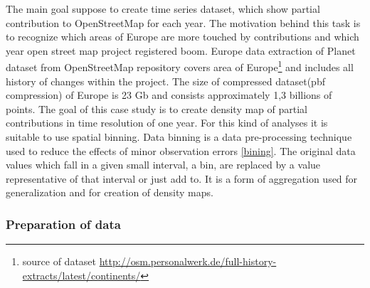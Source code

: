 \documentclass[a4paper,12pt,oneside]{report}
\begin{document}
	The main goal suppose to create time series dataset, which show partial contribution to OpenStreetMap for each year. The motivation behind this task is to recognize which areas of
	Europe are more touched by contributions and which year open street map
	project registered boom. Europe data extraction of Planet dataset from
        OpenStreetMap repository covers area of Europe\footnote{source of dataset
	\url{http://osm.personalwerk.de/full-history-extracts/latest/continents/}} 
	and includes all history of changes  within the project. The size of compressed
	dataset(pbf compression) of 
	Europe is 23 Gb and consists approximately 1,3 billions of points.
	The goal of this case study is to create density map of partial contributions in time
	resolution of one year. For this kind of analyses it is suitable to use spatial
	binning. Data binning is a data pre-processing technique used to reduce the
	effects of minor observation errors \ref{bining}. The original data values which
	fall in a given small interval, a bin, are replaced by a value representative of
	that interval or just add to. It is a form of aggregation used for
	generalization and for creation of density maps.
	
	
\subsubsection{Preparation of data}
\end{document}
